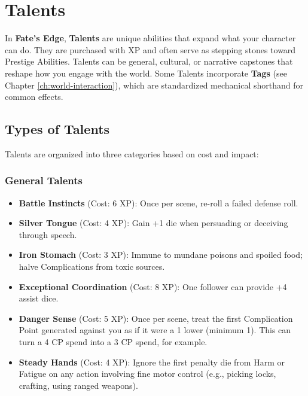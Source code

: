 
\chapter{Talents}
\label{ch:talents}

In \textbf{Fate's Edge}, \textbf{Talents}  are unique abilities that expand what your character can do. They are purchased with XP and often serve as stepping stones toward Prestige Abilities. Talents can be general, cultural, or narrative capstones that reshape how you engage with the world. Some Talents incorporate \textbf{Tags} (see Chapter \ref{ch:world-interaction}), which are standardized mechanical shorthand for common effects.

\section{Types of Talents}

Talents are organized into three categories based on cost and impact:

\subsection*{General Talents}

\begin{itemize}
    \item \textbf{Battle Instincts} (Cost: 6 XP): Once per scene, re-roll a failed defense roll.
    \item \textbf{Silver Tongue} (Cost: 4 XP): Gain +1 die when persuading or deceiving through speech.
    \item \textbf{Iron Stomach} (Cost: 3 XP): Immune to mundane poisons and spoiled food; halve Complications from toxic sources.
    \item \textbf{Exceptional Coordination} (Cost: 8 XP): One follower can provide +4 assist dice.
    \item \textbf{Danger Sense} (Cost: 5 XP): Once per scene, treat the first Complication Point generated against you as if it were a 1 lower (minimum 1). This can turn a 4 CP spend into a 3 CP spend, for example.
    \item \textbf{Steady Hands} (Cost: 4 XP): Ignore the first penalty die from Harm or Fatigue on any action involving fine motor control (e.g., picking locks, crafting, using ranged weapons).
\end{itemize}

